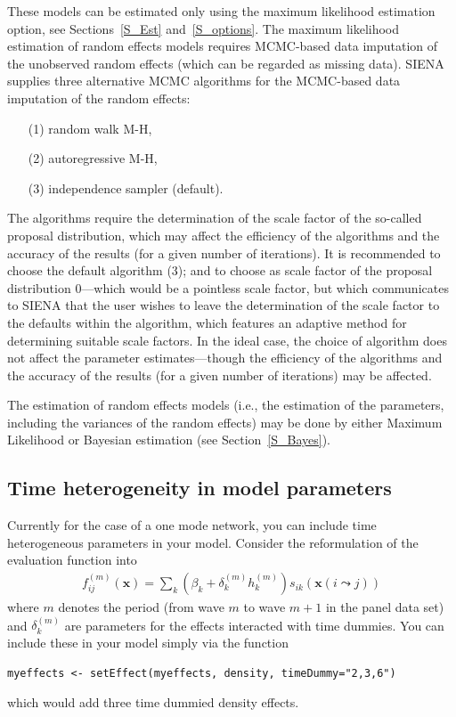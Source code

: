 \documentclass[a4paper,fleqn]{article}
\newcommand{\+}{\, + \,}
\newcommand{\SI}{{\sf SIENA }}
\begin{document}
{These models can be estimated only using the maximum likelihood
estimation option, see Sections~\ref{S_Est} and~\ref{S_options}.
The maximum likelihood estimation of random effects models requires MCMC-based data
imputation of the unobserved random effects (which can be regarded as missing data).
\SI supplies three alternative MCMC algorithms for the MCMC-based
data imputation of the random effects:
\begin{itemize}
\item[(1)] random walk M-H,
\item[(2)] autoregressive M-H,
\item[(3)] independence sampler (default).
\end{itemize}
The algorithms require the determination of the scale factor of the so-called proposal distribution,
which may affect the efficiency of the algorithms and
the accuracy of the results (for a given number of iterations).
It is recommended to choose the default algorithm (3);
and to choose as scale factor of the proposal distribution $0$---which
would be a pointless scale factor, but which communicates to \SI
that the user wishes to leave the determination of the scale factor to
the defaults within the algorithm,
which features an adaptive method for determining suitable scale factors.
In the ideal case, the choice of algorithm does not affect the
parameter estimates---though the efficiency of
the algorithms and the accuracy of the results (for a given number of iterations) may be affected.

The estimation of random effects models (i.e., the estimation of the parameters,
including the variances of the random effects) may be done by either Maximum Likelihood
or Bayesian estimation (see Section~\ref{S_Bayes}).

\fi

\subsection{Time heterogeneity in model parameters}
\label{S_timetest1}

Currently for the case of a one mode network, you can include
time heterogeneous parameters in your model. Consider the reformulation of
the evaluation function into
\begin{align}
f^{(m)}_{ij}(\mathbf{x})= \sum_k (\beta_k + \delta_k^{(m)} h_k^{(m)}) s_{ik}(\mathbf{x}(i \leadsto j))
\label{eq:fmij}
\end{align}
where $m$ denotes the period (from wave $m$ to wave $m+1$ in the panel data set)
and $\delta_k^{(m)}$ are parameters for the effects interacted
with time dummies. You
can include these in your model simply via the function
\begin{verbatim}
myeffects <- setEffect(myeffects, density, timeDummy="2,3,6")
\end{verbatim}
which would add three time dummied density effects.

}
\end{document}
